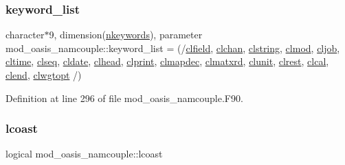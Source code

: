 \subsubsection{\texorpdfstring{keyword\+\_\+list}{keyword\_list}}
{\footnotesize\ttfamily character$\ast$9, dimension(\hyperlink{namespacemod__oasis__namcouple_ab629bd69885e9cd058f694b00474333a}{nkeywords}), parameter mod\+\_\+oasis\+\_\+namcouple\+::keyword\+\_\+list = (/\hyperlink{namespacemod__oasis__namcouple_a1c3afcba25a8ba41738104d42a59e423}{clfield}, \hyperlink{namespacemod__oasis__namcouple_ac0ead9ca992504e9b580db2678926b68}{clchan}, \hyperlink{namespacemod__oasis__namcouple_a4dde076bf8cce410eebbd878f791e32e}{clstring}, \hyperlink{namespacemod__oasis__namcouple_aa5cc4d0530b3e755441ef9ef70d8083b}{clmod}, \hyperlink{namespacemod__oasis__namcouple_afbdcab2dcd637c9c70db27c8c46bd2d7}{cljob}, \hyperlink{namespacemod__oasis__namcouple_a21a2ef5048e9fc9551821e8a0b8dec0b}{cltime}, \hyperlink{namespacemod__oasis__namcouple_a0d0b7fa2be2a8202344c0ef9085c1309}{clseq}, \hyperlink{namespacemod__oasis__namcouple_a0f2d8d935f9088aec74c4dda3e9f5d9c}{cldate}, \hyperlink{namespacemod__oasis__namcouple_a15338be5483b1b392e3e5580be75704d}{clhead}, \hyperlink{namespacemod__oasis__namcouple_aeaab03598b6067fbecd8d8fc0c54443e}{clprint}, \hyperlink{namespacemod__oasis__namcouple_acb6d787969090bd3c10b20775abf6531}{clmapdec}, \hyperlink{namespacemod__oasis__namcouple_ab529642a54ad832b85c11fe4bd843314}{clmatxrd}, \hyperlink{namespacemod__oasis__namcouple_a003e41234b67967593d94b3dca1a69c3}{clunit}, \hyperlink{namespacemod__oasis__namcouple_a283471addd7aefe719c8eb6bc45072b0}{clrest}, \hyperlink{namespacemod__oasis__namcouple_ad027273d67834ba44518cd9825f933b8}{clcal}, \hyperlink{namespacemod__oasis__namcouple_a52b0d4b9289219603308d3cb3fcc9eac}{clend}, \hyperlink{namespacemod__oasis__namcouple_a5ddab80f5f002c5cee81e3bbcfcda6be}{clwgtopt} /)\hspace{0.3cm}{\ttfamily [private]}}



Definition at line 296 of file mod\+\_\+oasis\+\_\+namcouple.\+F90.

\mbox{\label{namespacemod__oasis__namcouple_a7657e0f9b495e291f26dc31b4f6145aa}} 
\subsubsection{\texorpdfstring{lcoast}{lcoast}}
{\footnotesize\ttfamily logical mod\+\_\+oasis\+\_\+namcouple\+::lcoast\hspace{0.3cm}{\ttfamily [private]}}



